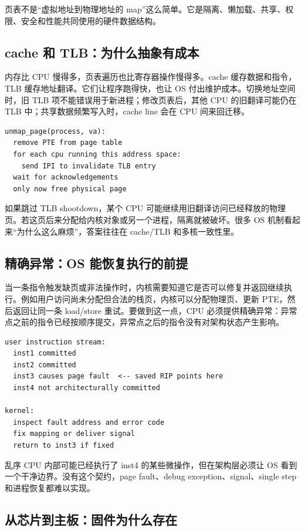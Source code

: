 页表不是“虚拟地址到物理地址的 map”这么简单。它是隔离、懒加载、共享、权限、安全和性能共同使用的硬件数据结构。

\subsection{cache 和 TLB：为什么抽象有成本}

内存比 CPU 慢得多，页表遍历也比寄存器操作慢得多。cache 缓存数据和指令，TLB 缓存地址翻译。它们让程序跑得快，也让 OS 付出维护成本。切换地址空间时，旧 TLB 项不能错误用于新进程；修改页表后，其他 CPU 的旧翻译可能仍在 TLB 中；共享数据频繁写入时，cache line 会在 CPU 间来回迁移。

\begin{lstlisting}
unmap_page(process, va):
  remove PTE from page table
  for each cpu running this address space:
    send IPI to invalidate TLB entry
  wait for acknowledgements
  only now free physical page
\end{lstlisting}

如果跳过 TLB shootdown，某个 CPU 可能继续用旧翻译访问已经释放的物理页。若这页后来分配给内核对象或另一个进程，隔离就被破坏。很多 OS 机制看起来“为什么这么麻烦”，答案往往在 cache/TLB 和多核一致性里。

\subsection{精确异常：OS 能恢复执行的前提}

当一条指令触发缺页或非法操作时，内核需要知道它是否可以修复并返回继续执行。例如用户访问尚未分配但合法的栈页，内核可以分配物理页、更新 PTE，然后返回让同一条 load/store 重试。要做到这一点，CPU 必须提供精确异常：异常点之前的指令已经按顺序提交，异常点之后的指令没有对架构状态产生影响。

\begin{lstlisting}
user instruction stream:
  inst1 committed
  inst2 committed
  inst3 causes page fault  <-- saved RIP points here
  inst4 not architecturally committed

kernel:
  inspect fault address and error code
  fix mapping or deliver signal
  return to inst3 if fixed
\end{lstlisting}

乱序 CPU 内部可能已经执行了 inst4 的某些微操作，但在架构层必须让 OS 看到一个干净边界。没有这个契约，page fault、debug exception、signal、single step 和进程恢复都难以实现。

\subsection{从芯片到主板：固件为什么存在}

